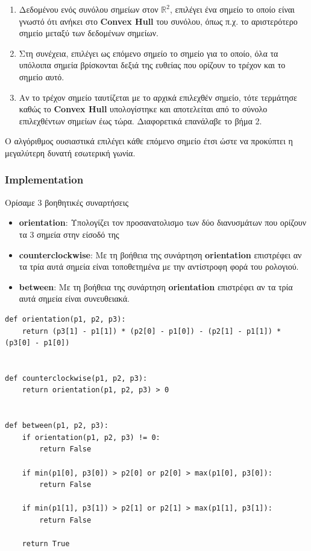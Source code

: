 \documentclass[12pt]{article}
\newcommand{\R}{\mathbb{R}}
\begin{document}
\begin{enumerate}
    \item Δεδομένου ενός συνόλου σημείων στον \( \R^2 \),
    επιλέγει ένα σημείο το οποίο είναι γνωστό ότι
    ανήκει στο \textbf{Convex Hull} του συνόλου,
    όπως π.χ. το αριστερότερο σημείο μεταξύ των δεδομένων σημείων.

    \item Στη συνέχεια, επιλέγει ως επόμενο σημείο το σημείο για το οποίο,
    όλα τα υπόλοιπα σημεία βρίσκονται δεξιά της ευθείας που ορίζουν
    το τρέχον και το σημείο αυτό.

    \item Αν το τρέχον σημείο ταυτίζεται με το αρχικά επιλεχθέν σημείο,
    τότε τερμάτησε καθώς το \textbf{Convex Hull} υπολογίστηκε και αποτελείται
    από το σύνολο επιλεχθέντων σημείων έως τώρα. Διαφορετικά επανάλαβε
    το βήμα 2.
\end{enumerate}

Ο αλγόριθμος ουσιαστικά επιλέγει κάθε επόμενο σημείο έτσι ώστε
να προκύπτει η μεγαλύτερη δυνατή εσωτερική γωνία. \\

\pagebreak

\subsubsection*{Implementation}

Ορίσαμε 3 βοηθητικές συναρτήσεις

\begin{itemize}
    \item \textbf{orientation}: Υπολογίζει τον προσανατολισμο
    των δύο διανυσμάτων που ορίζουν τα 3 σημεία στην είσοδό της

    \item \textbf{counterclockwise}: Με τη βοήθεια της συνάρτηση
    \textbf{orientation} επιστρέφει αν τα τρία αυτά σημεία είναι
    τοποθετημένα με την αντίστροφη φορά του ρολογιού.

    \item \textbf{between}: Με τη βοήθεια της συνάρτηση
    \textbf{orientation} επιστρέφει αν τα τρία αυτά σημεία είναι
    συνευθειακά.
\end{itemize}

\begin{lstlisting}
def orientation(p1, p2, p3):
    return (p3[1] - p1[1]) * (p2[0] - p1[0]) - (p2[1] - p1[1]) * (p3[0] - p1[0])


def counterclockwise(p1, p2, p3):
    return orientation(p1, p2, p3) > 0


def between(p1, p2, p3):
    if orientation(p1, p2, p3) != 0:
        return False

    if min(p1[0], p3[0]) > p2[0] or p2[0] > max(p1[0], p3[0]):
        return False

    if min(p1[1], p3[1]) > p2[1] or p2[1] > max(p1[1], p3[1]):
        return False

    return True
\end{lstlisting}
\end{document}
